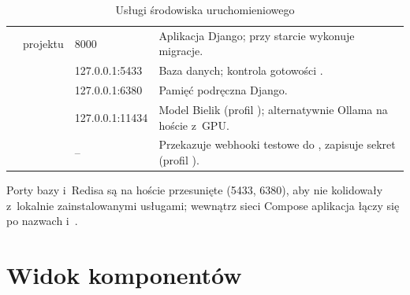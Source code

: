 \begin{table}[H]
\centering\small
\caption{Usługi środowiska uruchomieniowego}
\begin{tabularx}{\linewidth}{@{}lP{2.6cm}P{2.6cm}L@{}}
\toprule
{} &  &  &  \\
\midrule
{} &  projektu & 8000 & Aplikacja Django; przy starcie wykonuje migracje. \\
 &  & 127.0.0.1:5433 & Baza danych; kontrola gotowości . \\
 &  & 127.0.0.1:6380 & Pamięć podręczna Django. \\
 &  & 127.0.0.1:11434 & Model Bielik (profil ); alternatywnie Ollama na hoście z~GPU. \\
 &  & -- & Przekazuje webhooki testowe do , zapisuje sekret  (profil ). \\
\bottomrule
\end{tabularx}
\end{table}

Porty bazy i~Redisa są na hoście przesunięte (5433, 6380), aby nie kolidowały z~lokalnie
zainstalowanymi usługami; wewnątrz sieci Compose aplikacja łączy się po nazwach
 i~.

\section{Widok komponentów}

